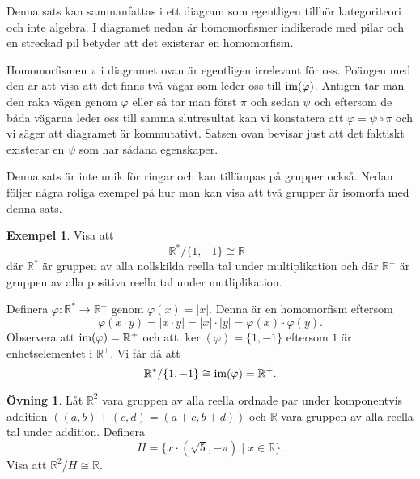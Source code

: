 \documentclass{article}
\newcommand{\im}[0]{\textnormal{im}}
\theoremstyle{definition}
\newtheorem{ovning}[thm]{Övning}
\newtheorem{exmp}[thm]{Exempel}
\begin{document}
Denna sats kan sammanfattas i ett diagram som egentligen tillhör kategoriteori och inte algebra.
I diagramet nedan är homomorfismer indikerade med pilar och en streckad pil betyder att det existerar en homomorfism. 

\begin{center}
\end{center}

Homomorfismen $\pi$ i diagramet ovan är egentligen irrelevant för oss. Poängen med den är att visa att det finns två vägar som leder oss 
till $\im(\varphi)$. Antigen tar man den raka vägen genom $\varphi$ eller så tar man först $\pi$ och sedan $\psi$ och eftersom 
de båda vägarna leder oss till samma slutresultat kan vi konstatera att $\varphi = \psi \circ \pi$ och vi säger att 
diagramet är kommutativt. Satsen ovan bevisar just 
att det faktiskt existerar en $\psi$ som har sådana egenskaper. 

Denna sats är inte unik för ringar och kan tillämpas på grupper också. Nedan följer några roliga exempel på hur man kan visa att 
två grupper är isomorfa med denna sats. 
\begin{exmp}
  Visa att 
  \[\mathbb{R}^*/\{1, -1\} \cong \mathbb{R}^+\]
  där $\mathbb{R}^*$ är gruppen av alla nollskilda reella tal under multiplikation och där $\mathbb{R}^+$ är gruppen av alla positiva reella tal under mutliplikation.

  Definera $\varphi: \mathbb{R}^* \rightarrow \mathbb{R}^+$ genom $\varphi(x) = |x|.$
  Denna är en homomorfism eftersom 
  \[\varphi(x \cdot y) = |x \cdot y| = |x| \cdot |y| = \varphi(x) \cdot \varphi(y).\]
  Observera att $\im(\varphi) = \mathbb{R}^+$ och att $\ker(\varphi) = \{1, -1\}$ eftersom $1$ är enhetselementet i $\mathbb{R}^+$. Vi får då att 
  \[\mathbb{R}^* / \{1, -1\} \cong \im(\varphi) = \mathbb{R}^+.\] 
\end{exmp}

\begin{ovning}
  Låt $\mathbb{R}^2$ vara gruppen av alla reella ordnade par under komponentvis addition $((a, b) + (c, d) = (a + c, b + d))$ och $\mathbb{R}$
  vara gruppen av alla reella tal under addition. Definera 
  \[H = \biggl\{x \cdot (\sqrt 5, -\pi) \; | \; x \in \mathbb{R} \biggr\}.\]
  Visa att $\mathbb{R}^2 / H \cong \mathbb{R}.$
\end{ovning}
\end{document}
